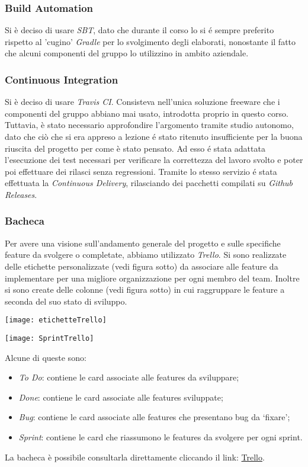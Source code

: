 \subsubsection{Build Automation}
Si è deciso di usare \textit{SBT}, dato che durante il corso lo si é sempre preferito rispetto al 'cugino' \textit{Gradle} per lo svolgimento degli elaborati, nonostante il fatto che alcuni componenti del gruppo lo utilizzino in ambito aziendale.

\subsubsection{Continuous Integration}
Si è deciso di usare \textit{Travis CI}.
Consisteva nell'unica soluzione freeware che i componenti del gruppo abbiano mai usato, introdotta proprio in questo corso.
Tuttavia, è stato necessario approfondire l'argomento tramite studio autonomo, dato che ciò che si era appreso a lezione é stato ritenuto insufficiente per la buona riuscita del progetto per come è stato pensato.
Ad esso é stata adattata l'esecuzione dei test necessari per verificare la correttezza del lavoro svolto e poter poi effettuare dei rilasci senza regressioni.
Tramite lo stesso servizio é stata effettuata la \textit{Continuous Delivery}, rilasciando dei pacchetti compilati su \textit{Github Releases}.

\subsubsection{Bacheca}
Per avere una visione sull’andamento generale del progetto e sulle specifiche feature da svolgere o completate, abbiamo utilizzato \textit{Trello}.
\newline
Si sono realizzate delle etichette personalizzate (vedi figura sotto) da associare alle feature da implementare per una migliore organizzazione per ogni membro del team. Inoltre si sono create delle colonne (vedi figura sotto) in cui raggruppare le feature a seconda del suo stato di sviluppo.
\begin{center}
    \texttt{[image: etichetteTrello]}
\end{center}
\begin{center}
    \texttt{[image: SprintTrello]}
\end{center}
Alcune di queste sono:
\begin{itemize}
    \item \textit{To Do}: contiene le card associate alle features da sviluppare;
    \item \textit{Done}: contiene le card associate alle features sviluppate;
    \item \textit{Bug}: contiene le card associate alle features che presentano bug da ‘fixare’;
    \item \textit{Sprint}: contiene le card che riassumono le features da svolgere per ogni sprint.
\end{itemize}
La bacheca è possibile consultarla direttamente cliccando il link:   \href{https://trello.com/b/Nk4j3Kuf/pps}{Trello}.
